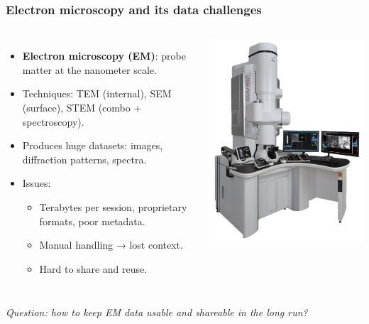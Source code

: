 \documentclass{beamer}
\begin{document}
\begin{frame}
	\frametitle{Electron microscopy and its data challenges}
	\begin{columns}[T,totalwidth=\textwidth]
		\begin{itemize}
			\item \textbf{Electron microscopy (EM)}: probe matter at the nanometer scale.
			\item Techniques: TEM (internal), SEM (surface), STEM (combo + spectroscopy).
			\item Produces huge datasets: images, diffraction patterns, spectra.
			\item Issues:
			\begin{itemize}
				\item Terabytes per session, proprietary formats, poor metadata.
				\item Manual handling → lost context.
				\item Hard to share and reuse.
			\end{itemize}
		\end{itemize}
		
		\includegraphics[width=\linewidth]{otherResources/LAME_microscope.png}
	\end{columns}
	
	\vspace{0.4em}
	\small\itshape Question: how to keep EM data usable and shareable in the long run?
\end{frame}
\end{document}
